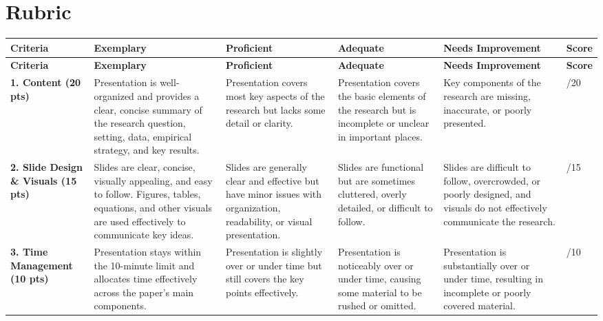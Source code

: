 \documentclass[
]{article}
\begin{document}
\newpage

\hypertarget{rubric}{%
\section{Rubric}\label{rubric}}

\footnotesize

\setlength{\tabcolsep}{3pt}
\renewcommand{\arraystretch}{1.15}

\begin{longtable}{
|>{\raggedright\arraybackslash}p{1.9cm}
|>{\raggedright\arraybackslash}p{2.7cm}
|>{\raggedright\arraybackslash}p{2.7cm}
|>{\raggedright\arraybackslash}p{2.7cm}
|>{\raggedright\arraybackslash}p{2.7cm}
|>{\centering\arraybackslash}p{0.8cm}|
}

\hline
\textbf{Criteria}
& \textbf{Exemplary}
& \textbf{Proficient}
& \textbf{Adequate}
& \textbf{Needs Improvement}
& \textbf{Score} \\
\hline
\endfirsthead

\hline
\textbf{Criteria}
& \textbf{Exemplary}
& \textbf{Proficient}
& \textbf{Adequate}
& \textbf{Needs Improvement}
& \textbf{Score} \\
\hline
\endhead

\textbf{1. Content (20 pts)}
&
Presentation is well-organized and provides a clear, concise summary of the research question, setting, data, empirical strategy, and key results.
&
Presentation covers most key aspects of the research but lacks some detail or clarity.
&
Presentation covers the basic elements of the research but is incomplete or unclear in important places.
&
Key components of the research are missing, inaccurate, or poorly presented.
&
/20 \\
\hline

\textbf{2. Slide Design \& Visuals (15 pts)}
&
Slides are clear, concise, visually appealing, and easy to follow. Figures, tables, equations, and other visuals are used effectively to communicate key ideas.
&
Slides are generally clear and effective but have minor issues with organization, readability, or visual presentation.
&
Slides are functional but are sometimes cluttered, overly detailed, or difficult to follow.
&
Slides are difficult to follow, overcrowded, or poorly designed, and visuals do not effectively communicate the research.
&
/15 \\
\hline

\textbf{3. Time Management (10 pts)}
&
Presentation stays within the 10-minute limit and allocates time effectively across the paper's main components.
&
Presentation is slightly over or under time but still covers the key points effectively.
&
Presentation is noticeably over or under time, causing some material to be rushed or omitted.
&
Presentation is substantially over or under time, resulting in incomplete or poorly covered material.
&
/10 \\
\hline


\end{longtable}
\end{document}
